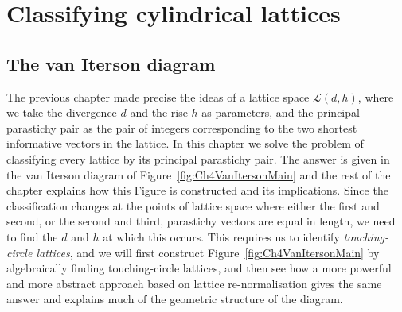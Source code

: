 

\chapter{Classifying cylindrical lattices}
\label{ch:classifying}


\section{The van Iterson diagram}
The previous chapter made precise the ideas  of a lattice space $\mathcal{L}(d,h)$, where we take the divergence $d$ and the rise $h$ as parameters, and the principal parastichy pair as the pair of integers corresponding to the two shortest informative vectors in the lattice. In this chapter  we solve the problem of classifying every lattice by its principal parastichy pair.
The answer is given in the van Iterson diagram of Figure~\ref{fig:Ch4VanItersonMain} and the rest of the chapter explains how this Figure is constructed and its implications. 
 Since the classification changes at the points of lattice space where either the first and second, or the second and third, parastichy vectors are equal in length, we need to find the $d$ and $h$ at which this occurs. This requires us to identify \emph{touching-circle lattices}, and we will first construct Figure~\ref{fig:Ch4VanItersonMain} by algebraically finding touching-circle lattices, and then see how a more powerful and more abstract approach based on lattice re-normalisation gives the same answer and explains much of the geometric structure of the diagram. 
 
 
\clearpage

